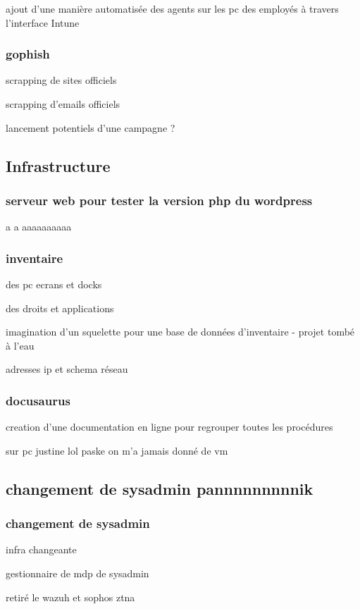 ajout d'une manière automatisée des agents sur les pc des employés à travers l'interface Intune

\subsubsection{gophish}
scrapping de sites officiels

scrapping d'emails officiels

lancement potentiels d'une campagne ?


\subsection{Infrastructure}
\subsubsection{serveur web pour tester la version php du wordpress}
a   a   aaaaaaaaaa
\subsubsection{inventaire}
des pc ecrans et docks

des droits et applications

imagination d'un squelette pour une base de données d'inventaire - projet tombé à l'eau

adresses ip et schema réseau

\subsubsection{docusaurus}
creation d'une documentation en ligne pour regrouper toutes les procédures

sur pc justine lol paske on m'a jamais donné de vm

\subsection{changement de sysadmin pannnnnnnnnik}
\subsubsection{changement de sysadmin}
infra changeante

gestionnaire de mdp de sysadmin

retiré le wazuh et sophos ztna
